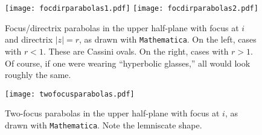 \documentclass[12pt]{amsart}
\theoremstyle{definition}
\begin{document}
\begin{figure}[hbt]
\begin{center}
  \texttt{[image: focdirparabolas1.pdf]}\qquad\qquad
  \texttt{[image: focdirparabolas2.pdf]}
\end{center}
\caption{Focus/directrix parabolas in the upper half-plane with focus at $i$
and directrix $|z|=r$, as drawn with \texttt{Mathematica}.  On the
left, cases with $r < 1$. These are Cassini ovals.  On the right,
cases with $r>1$. Of course, if one were wearing ``hyperbolic glasses,''
all would look roughly the same.}
\label{fig:parabolas1}
\end{figure}
\begin{figure}[hbt]
\begin{center}
\texttt{[image: twofocusparabolas.pdf]}
\end{center}
\caption{Two-focus parabolas in the upper half-plane with focus at $i$,
  as drawn with \texttt{Mathematica}.  Note the lemniscate shape.}
\label{fig:parabolas2}
\end{figure}
\end{document}
